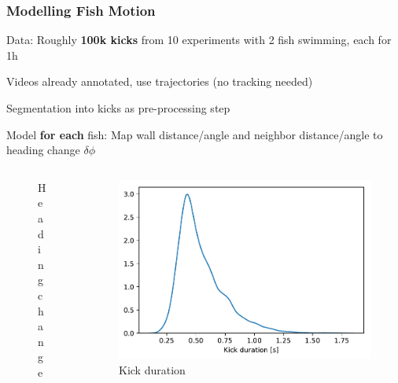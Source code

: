 \documentclass{beamer}
\begin{document}
\begin{frame}
  \frametitle{Modelling Fish Motion}
Data: Roughly \textbf{100k kicks} from 10 experiments with 2 fish swimming, each for 1h

Videos already annotated, use trajectories (\alert{no tracking needed})

Segmentation into kicks as pre-processing step

Model \textbf{for each} fish: Map wall distance/angle and neighbor distance/angle to heading change $\delta \phi$
\begin{columns}
  \begin{column}{0.24\linewidth}
    \begin{figure}[h]
      \centering
 \caption*{Heading change}
\end{figure}
\end{column}

\begin{column}{0.4\linewidth}
  \begin{figure}[h]
    \centering
\includegraphics[clip, width=0.8\linewidth]{kick_duration.pdf}
    \caption*{Kick duration}
  \end{figure}
\end{column}


\end{columns}
\end{frame}
\end{document}
